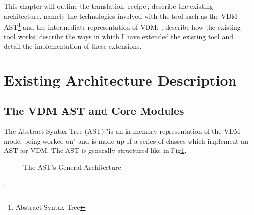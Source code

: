 This chapter will outline the translation 'recipe'; describe the existing architecture, namely the technologies involved with the tool such as the VDM AST\footnote{Abstract Syntax Tree} and the intermediate representation of VDM; ; describe how the existing tool works; describe the ways in which I have extended the existing tool and detail the implementation of these extensions.
\hfill\break
\section{Existing Architecture Description} \label{ead}
\subsection{The VDM AST and Core Modules}
The Abstract Syntax Tree (AST) "is an in-memory representation of the VDM model being worked on"\parencite{OvertureWikiArchitectureDescription} and is made up of a series of classes which implement an AST for VDM. The AST is generally structured like in Fig\ref{fig:AST General Architecture}.
\begin{figure}
        \caption{\label{fig:AST General Architecture} The AST's General Architecture \parencite{vdmwikiast}}
      \end{figure}.

